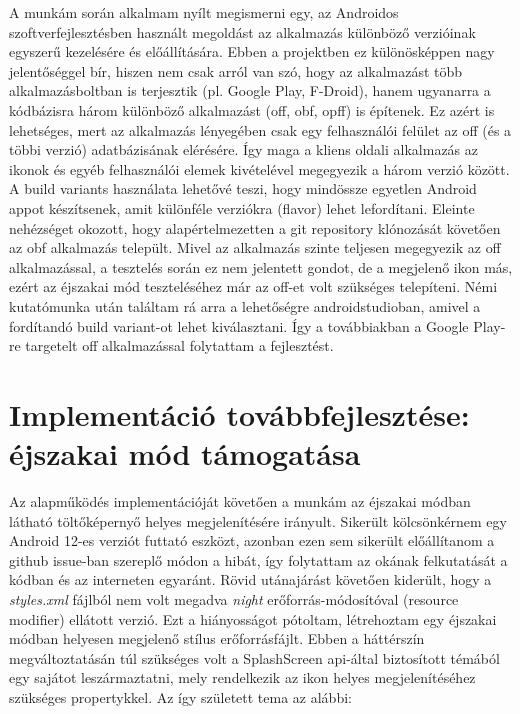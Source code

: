 A munkám során alkalmam nyílt megismerni egy, az Androidos szoftverfejlesztésben használt
megoldást az alkalmazás különböző verzióinak egyszerű kezelésére és előállítására. Ebben a projektben ez
különösképpen nagy jelentőséggel bír, hiszen nem csak arról van szó, hogy az alkalmazást több
alkalmazásboltban is terjesztik (pl. Google Play, F-Droid), hanem ugyanarra a kódbázisra
három különböző alkalmazást (\acrfull{off}, \acrfull{obf}, \acrfull{opff})
is építenek. Ez azért is lehetséges, mert az alkalmazás lényegében csak egy felhasználói felület
az \acrlong{off} (és a többi verzió) adatbázisának elérésére. Így maga a kliens oldali alkalmazás
az ikonok és egyéb felhasználói elemek kivételével megegyezik a három verzió között.
A build variants használata lehetővé teszi, hogy mindössze egyetlen Android appot
készítsenek, amit különféle verziókra (flavor) lehet lefordítani. Eleinte nehézséget okozott,
hogy alapértelmezetten a git repository klónozását követően az \acrlong{obf} alkalmazás
települt. Mivel az alkalmazás szinte teljesen megegyezik az \acrlong{off} alkalmazással, a
tesztelés során ez nem jelentett gondot, de a  megjelenő ikon más, ezért az éjszakai
mód teszteléséhez már az \acrlong{off}-et volt szükséges telepíteni. Némi kutatómunka után
találtam rá arra a lehetőségre \gls{androidstudio}ban, amivel a fordítandó build variant-ot lehet
kiválasztani. Így a továbbiakban a Google Play-re targetelt \acrlong{off} alkalmazással
folytattam a fejlesztést.

\section{Implementáció továbbfejlesztése: éjszakai mód támogatása}
Az alapműködés implementációját követően a munkám az éjszakai módban látható töltőképernyő helyes megjelenítésére irányult.
Sikerült kölcsönkérnem egy Android 12-es verziót futtató eszközt, azonban ezen sem sikerült
előállítanom a \gls{github} issue-ban \cite{issue} szereplő módon a hibát, így folytattam az okának felkutatását
a kódban és az interneten egyaránt. Rövid utánajárást követően kiderült, hogy a
\textit{styles.xml} fájlból nem volt megadva \textit{night} erőforrás-módosítóval
(resource modifier) ellátott verzió. Ezt a hiányosságot pótoltam, létrehoztam egy éjszakai
módban helyesen megjelenő stílus erőforrásfájlt. Ebben a háttérszín megváltoztatásán túl szükséges
volt a SplashScreen \acrshort{api}-által biztosított témából egy sajátot leszármaztatni, mely rendelkezik
az ikon helyes megjelenítéséhez szükséges propertykkel. Az így született \gls{tema} az alábbi:

